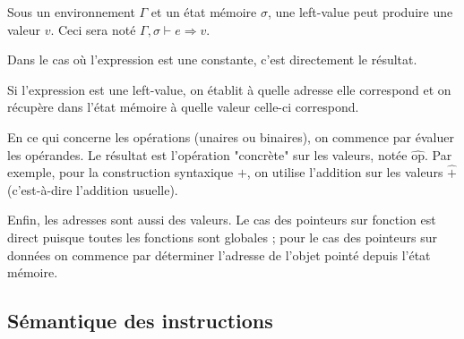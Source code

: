\begin{definition}
  Sous un environnement $Γ$ et un état mémoire $σ$, une left-value peut
  produire une valeur $v$. Ceci sera noté $Γ, σ ⊢ e ⇒ v$.
\end{definition}

Dans le cas où l'expression est une constante, c'est directement le résultat.

\begin{mathpar}
\end{mathpar}

Si l'expression est une left-value, on établit à quelle adresse elle correspond
et on récupère dans l'état mémoire à quelle valeur celle-ci correspond.

\begin{mathpar}
\end{mathpar}

En ce qui concerne les opérations (unaires ou binaires), on commence par évaluer
les opérandes. Le résultat est l'opération "concrète" sur les valeurs, notée
$\widehat{\textrm{op}}$. Par exemple, pour la construction syntaxique $+$, on
utilise l'addition sur les valeurs $\widehat{+}$ (c'est-à-dire l'addition
usuelle).


Enfin, les adresses sont aussi des valeurs. Le cas des pointeurs sur fonction
est direct puisque toutes les fonctions sont globales ; pour le cas des
pointeurs sur données on commence par déterminer l'adresse de l'objet pointé
depuis l'état mémoire.


\subsection{Sémantique des instructions}

